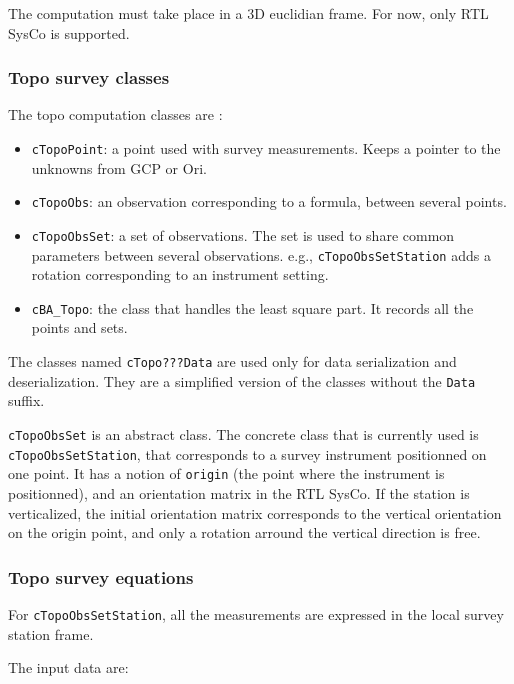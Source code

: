 The computation must take place in a 3D euclidian frame.
For now, only RTL SysCo is supported.


\subsubsection{Topo survey classes}

The topo computation classes are :
 \begin{itemize}
    \item \texttt{cTopoPoint}: a point used with survey measurements. Keeps a pointer to the unknowns from GCP or Ori.
    \item \texttt{cTopoObs}: an observation corresponding to a formula, between several points.
    \item \texttt{cTopoObsSet}: a set of observations. The set is used to share common parameters between several observations. e.g., \texttt{cTopoObsSetStation} adds a rotation corresponding to an instrument setting.   
    \item \texttt{cBA\_Topo}: the class that handles the least square part. It records all the points and sets.
 \end{itemize}

The classes named \texttt{cTopo???Data} are used only for data serialization and deserialization.
They are a simplified version of the classes without the \texttt{Data} suffix.


\texttt{cTopoObsSet} is an abstract class.
The concrete class that is currently used is \texttt{cTopoObsSetStation}, that corresponds to a survey instrument positionned on one point.
It has a notion of {\tt origin} (the point where the instrument is positionned), and an orientation matrix in the RTL SysCo.
If the station is verticalized, the initial orientation matrix corresponds to the vertical orientation on the origin point, and only a rotation arround the vertical direction is free.

\subsubsection{Topo survey equations}

For \texttt{cTopoObsSetStation}, all the measurements are expressed in the local survey station frame.

The input data are:

